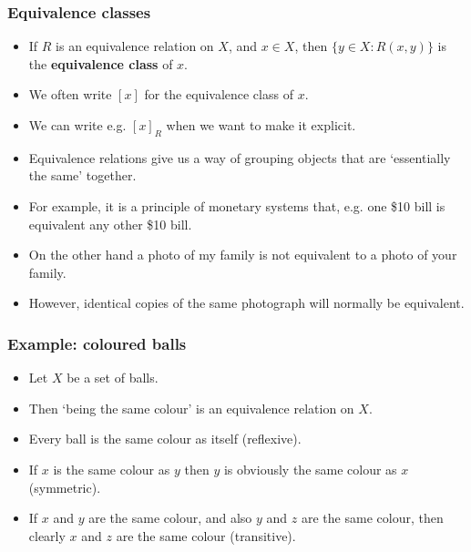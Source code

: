 \documentclass[handout]{beamer}
\begin{document}
\begin{frame}
\frametitle{Equivalence classes}
\begin{itemize}
\item If $R$ is an equivalence relation on $X$, and $x\in X$, then $\{y\in X: R(x,y)\}$ is the \textbf{equivalence class} of $x$. 
\vspace{0.2cm}
\item We often write $[x]$ for the equivalence class of $x$. 
\vspace{0.2cm}
\item We can write e.g. $[x]_R$ when we want to make it explicit. 
\vspace{0.2cm}
\item Equivalence relations give us a way of grouping objects that are `essentially the same' together.
\vspace{0.2cm}
\item For example, it is a principle of monetary systems that, e.g. one \$10 bill is equivalent any other \$10 bill.
\vspace{0.2cm}
\item On the other hand a photo of my family is not equivalent to a photo of your family. 
\vspace{0.2cm}
\item However, identical copies of the same photograph will normally be equivalent.
\end{itemize}
\end{frame}

\begin{frame}
\frametitle{Example: coloured balls}
\begin{example}
\begin{itemize}
\item Let $X$ be a set of balls. 
\vspace{0.3cm}
\item Then `being the same colour' is an equivalence relation on $X$. 
\vspace{0.3cm}
\item Every ball is the same colour as itself  (reflexive). 
\vspace{0.3cm}
\item If $x$ is the same colour as $y$ then $y$ is obviously the same colour as $x$ (symmetric). 
\vspace{0.3cm}
\item If $x$ and $y$ are the same colour, and also $y$ and $z$ are the same colour, then clearly $x$ and $z$ are the same colour (transitive).
\end{itemize}
\end{example}
\end{frame}
\end{document}
